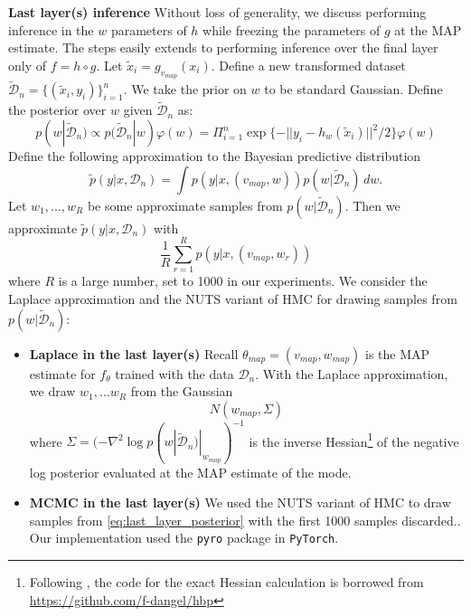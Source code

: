 \documentclass{article} %
\begin{document}
\textbf{Last layer(s) inference}
Without loss of generality, we discuss performing inference in the $w$ parameters of $h$ while freezing the parameters of $g$ at the MAP estimate. The steps easily extends to performing inference over the final layer only of $f = h \circ g$. Let $\tilde x_i = g_{v_{map}}(x_i)$. Define a new transformed dataset $\tilde{\mathcal D}_n = \{(\tilde x_i, y_i) \}_{i=1}^n$. We take the prior on $w$ to be standard Gaussian. 
Define the posterior over $w$ given $\tilde{\mathcal D}_n$ as:
\begin{equation}
p(w | \tilde{\mathcal D}_n) \propto p(\tilde{\mathcal D}_n | w) \varphi(w) = \Pi_{i=1}^n \exp\{-|| y_i - h_w(\tilde x_i) ||^2/2\} \varphi(w)
\label{eq:last_layer_posterior}
\end{equation}
Define the following approximation to the Bayesian predictive distribution
$$
\tilde p(y|x, \mathcal D_n) = \int p(y|x,(v_{map},w)) p(w|\tilde{\mathcal D}_n) \,dw.
$$
Let $w_1,\ldots,w_R$ be some approximate samples from $p(w | \tilde{\mathcal D}_n)$. Then we approximate $\tilde p(y|x, \mathcal D_n)$ with
\[
\frac{1}{R} \sum_{r=1}^R p(y|x,(v_{map},w_r))
\]
where $R$ is a large number, set to 1000 in our experiments. We consider the Laplace approximation and the NUTS variant of HMC for drawing samples from $p(w | \tilde{\mathcal D}_n)$:

\begin{itemize}
	\item \textbf{Laplace in the last layer(s)}
	Recall $\theta_{map} = (v_{map}, w_{map})$ is the MAP estimate for $f_\theta$ trained with the data $\mathcal D_n$. With the Laplace approximation, we draw $w_1,\ldots w_R$ from the Gaussian
	\[
	N(w_{map}, \Sigma)
	\]
	where $\Sigma = (- \nabla^2 \log p(w| \tilde{\mathcal D}_n) |_{w_{map}})^{-1}$ is the inverse Hessian\footnote{Following \citet{kristiadi_being_2020}, the code for the exact Hessian calculation is borrowed from \url{https://github.com/f-dangel/hbp}} of the negative log posterior evaluated at the MAP estimate of the mode.
	\item \textbf{MCMC in the last layer(s)}
	We used the NUTS variant of HMC to draw samples from \eqref{eq:last_layer_posterior} with the first 1000 samples  discarded.. Our implementation used the \texttt{pyro} package in \texttt{PyTorch}.
	
\end{itemize}
\end{document}
